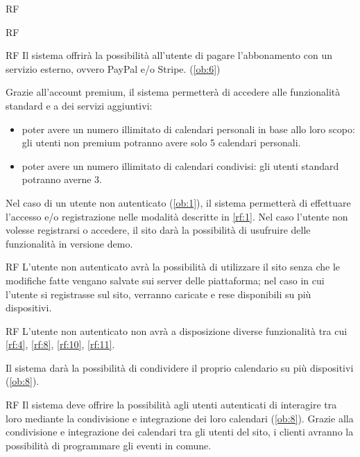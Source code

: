\begin {listaPersonale}{RF}
\begin {listaPersonale2}{RF}
\begin {listaPersonale3}{RF}
Il sistema offrirà la possibilità all’utente di pagare l’abbonamento con un servizio esterno, ovvero PayPal e/o Stripe. (\ref{ob:6})


Grazie all’account premium, il sistema permetterà di accedere alle funzionalità standard e a dei servizi aggiuntivi:
\begin{itemize}
    \item poter avere un numero illimitato di calendari personali in base allo loro scopo: gli utenti non premium potranno avere solo 5 calendari personali.
    \item poter avere un numero illimitato di calendari condivisi: gli utenti standard potranno averne 3.
\end{itemize}


\end {listaPersonale3}
\end {listaPersonale2}

Nel caso di un utente non autenticato (\ref{ob:1}), il sistema permetterà di effettuare l’accesso e/o registrazione nelle modalità descritte in \ref{rf:1}. Nel caso l’utente non volesse registrarsi o accedere, il sito darà la possibilità di usufruire delle funzionalità in versione demo.

\begin{listaPersonale2}{RF}
    L'utente non autenticato avrà la possibilità di utilizzare il sito senza che le modifiche
    fatte vengano salvate sui server delle piattaforma; nel caso in cui l'utente si registrasse sul sito, verranno caricate e rese disponibili su più dispositivi.

\begin{listaPersonale3}{RF}
    L’utente non autenticato non avrà a disposizione diverse funzionalità tra cui \ref{rf:4}, \ref{rf:8}, \ref{rf:10}, \ref{rf:11}.
\end{listaPersonale3}
\end{listaPersonale2}

Il sistema darà la possibilità di condividere il proprio calendario su più dispositivi (\ref{ob:8}).

\begin{listaPersonale2}{RF}
Il sistema deve offrire la possibilità agli utenti autenticati di interagire tra loro 
mediante la condivisione e integrazione dei loro calendari (\ref{ob:8}). 
Grazie alla condivisione e integrazione dei calendari tra gli utenti del sito, i clienti avranno la possibilità di programmare gli eventi in comune.
\end{listaPersonale2}


\end{listaPersonale}

